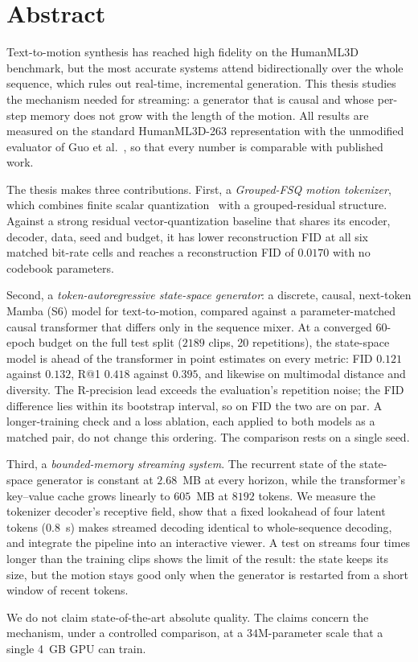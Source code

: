 \chapter*{Abstract}

Text-to-motion synthesis has reached high fidelity on the HumanML3D benchmark, but the most accurate systems attend bidirectionally over the whole sequence, which rules out real-time, incremental generation. This thesis studies the mechanism needed for streaming: a generator that is causal and whose per-step memory does not grow with the length of the motion. All results are measured on the standard HumanML3D-263 representation with the unmodified evaluator of Guo et al.~\cite{guo2022humanml3d}, so that every number is comparable with published work.

The thesis makes three contributions. First, a \emph{Grouped-FSQ motion tokenizer}, which combines finite scalar quantization~\cite{mentzer2023fsq} with a grouped-residual structure. Against a strong residual vector-quantization baseline that shares its encoder, decoder, data, seed and budget, it has lower reconstruction FID at all six matched bit-rate cells and reaches a reconstruction FID of $0.0170$ with no codebook parameters.

Second, a \emph{token-autoregressive state-space generator}: a discrete, causal, next-token Mamba (S6) model for text-to-motion, compared against a parameter-matched causal transformer that differs only in the sequence mixer. At a converged 60-epoch budget on the full test split ($2189$ clips, 20 repetitions), the state-space model is ahead of the transformer in point estimates on every metric: FID $0.121$ against $0.132$, R@1 $0.418$ against $0.395$, and likewise on multimodal distance and diversity. The R-precision lead exceeds the evaluation's repetition noise; the FID difference lies within its bootstrap interval, so on FID the two are on par. A longer-training check and a loss ablation, each applied to both models as a matched pair, do not change this ordering. The comparison rests on a single seed.

Third, a \emph{bounded-memory streaming system}. The recurrent state of the state-space generator is constant at $2.68$~MB at every horizon, while the transformer's key--value cache grows linearly to $605$~MB at $8192$ tokens. We measure the tokenizer decoder's receptive field, show that a fixed lookahead of four latent tokens ($0.8$~s) makes streamed decoding identical to whole-sequence decoding, and integrate the pipeline into an interactive viewer. A test on streams four times longer than the training clips shows the limit of the result: the state keeps its size, but the motion stays good only when the generator is restarted from a short window of recent tokens.

We do not claim state-of-the-art absolute quality. The claims concern the mechanism, under a controlled comparison, at a $34$M-parameter scale that a single 4~GB GPU can train.
